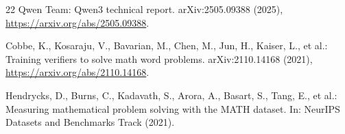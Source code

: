 \begin{thebibliography}{22}
Qwen Team: Qwen3 technical report. arXiv:2505.09388 (2025),
\url{https://arxiv.org/abs/2505.09388}.

Cobbe, K., Kosaraju, V., Bavarian, M., Chen, M., Jun, H., Kaiser, L., et al.:
Training verifiers to solve math word problems. arXiv:2110.14168 (2021),
\url{https://arxiv.org/abs/2110.14168}.

Hendrycks, D., Burns, C., Kadavath, S., Arora, A., Basart, S., Tang, E., et
al.: Measuring mathematical problem solving with the MATH dataset. In: NeurIPS
Datasets and Benchmarks Track (2021).

\end{thebibliography}
\endgroup
